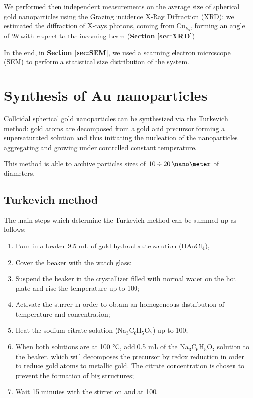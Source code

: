 \documentclass[twocolumn]{article}
\begin{document}
\begin{multicols}{2}
We performed then independent measurements on the average size of spherical gold nanoparticles using the Grazing incidence X-Ray Diffraction (XRD): we estimated the diffraction of X-rays photons, coming from \(\text{Cu}_{k_\alpha}\), forming an angle of \(2\theta\) with respect to the incoming beam (\textbf{Section \ref{sec:XRD}}).

In the end, in \textbf{Section \ref{sec:SEM}}, we used a scanning electron microscope (SEM) to perform a statistical size distribution of the system.


\section{Synthesis of Au nanoparticles}
\label{sec:synthesis}
\noindent
Colloidal spherical gold nanoparticles can be synthesized via the Turkevich method: gold atoms are decomposed from a gold acid precursor forming a supersaturated solution and thus initiating the nucleation of the nanoparticles aggregating and growing under controlled constant temperature.

This method is able to archive particles sizes of $10 \div 20 \,\nano\meter$ of diameters.

\clearpage

\subsection{Turkevich method}
The main steps which determine the Turkevich method can be summed up as follows:

\begin{enumerate}
    \item Pour in a beaker 9.5 mL of gold hydroclorate solution (HAuCl$_4$);
    \item Cover the beaker with the watch glass;
    \item Suspend the beaker in the crystallizer filled with normal water on the hot plate and rise the temperature up to 100\degreecelsius;
    \item Activate the stirrer in order to obtain an homogeneous distribution of temperature and concentration;
    \item Heat the sodium citrate solution (Na$_3$C$_6$H$_5$O$_7$) up to 100\degreecelsius;
    \item When both solutions are at 100 °C, add 0.5 mL of the Na$_3$C$_6$H$_5$O$_7$ solution to the beaker, which will decomposes the precursor by redox reduction in order to reduce gold atoms to metallic gold. The citrate concentration is chosen to prevent the formation of big structures;
    \item Wait 15 minutes with the stirrer on and at 100\degreecelsius.
\end{enumerate}


\end{multicols}
\end{document}
